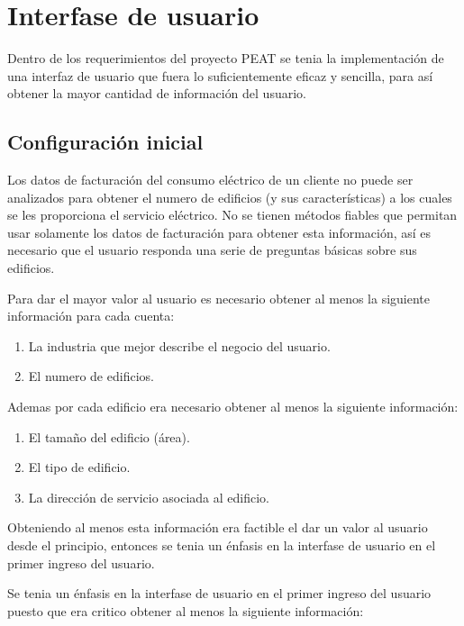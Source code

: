 
\section{Interfase de usuario}
Dentro de los requerimientos del proyecto PEAT se tenia la implementación de una
interfaz de usuario que fuera lo suficientemente eficaz y sencilla, para así obtener
la mayor cantidad de información del usuario.

\subsection{Configuración inicial}

Los datos de facturación del consumo eléctrico de un cliente no puede ser analizados
para obtener el numero de edificios (y sus características) a los cuales se les
proporciona el servicio eléctrico. No se tienen métodos fiables que permitan
usar solamente los datos de facturación para obtener esta información, así es
necesario que el usuario responda una serie de preguntas básicas sobre sus edificios.

Para dar el mayor valor al usuario es necesario obtener al menos la siguiente información
para cada cuenta:

\begin{enumerate}
\item La industria que mejor describe el negocio del usuario.
\item El numero de edificios.
\end{enumerate}

Ademas por cada edificio era necesario obtener al menos la siguiente información:

\begin{enumerate}
\item El tamaño del edificio (área).
\item El tipo de edificio.
\item La dirección de servicio asociada al edificio.
\end{enumerate}

Obteniendo al menos esta información era factible el dar un valor al usuario desde el
principio, entonces se tenia un énfasis en la interfase de usuario en el primer ingreso
del usuario.

Se tenia un énfasis en la interfase de usuario en el primer ingreso del usuario puesto
que era critico obtener al menos la siguiente información:

